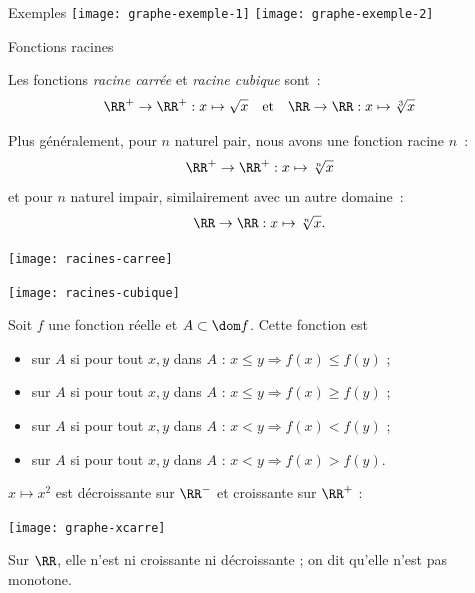 \begin{frame}{Exemples}
\texttt{[image: graphe-exemple-1]} \hfill \texttt{[image: graphe-exemple-2]}
\end{frame}

\begin{frame}{Fonctions racines}
  \begin{example}
    Les fonctions \emph{racine carrée} et \emph{racine cubique} sont~:
    \begin{equation*}
      \RR^+ \to \RR^{+} : x \mapsto \sqrt{x} \quad \text{et} \quad  \RR \to \RR : x \mapsto \sqrt[3]{x}
    \end{equation*}
  \end{example}\pause

  \begin{example}
    Plus généralement, pour \(n\) naturel pair, nous avons une fonction racine \(n\)\ieme{}~:
    \begin{equation*}
      \RR^+ \to \RR^{+} : x \mapsto \sqrt[n]{x}
    \end{equation*}
    et pour \(n\) naturel impair, similairement avec un autre domaine~:
    \begin{equation*}
      \RR \to \RR : x \mapsto \sqrt[n]{x}.
    \end{equation*}
  \end{example}
\end{frame}

\begin{frame}
  \texttt{[image: racines-carree]}
\end{frame}
\begin{frame}
  \texttt{[image: racines-cubique]}
\end{frame}

\begin{frame}
\begin{definition}
  Soit \(f\) une fonction réelle et \(A \subset \dom f\). Cette fonction est
  \begin{itemize}[<+->]
  \item {} sur \(A\) si pour tout \(x, y\) dans \(A\) : \(x \leq y \Rightarrow f(x) \leq f(y)\) ;
  \item {} sur \(A\) si pour tout \(x, y\) dans \(A\) : \(x \leq y \Rightarrow f(x) \geq f(y)\) ;
  \item {} sur \(A\) si pour tout \(x, y\) dans \(A\) : \(x < y \Rightarrow f(x) < f(y)\) ;
  \item {} sur \(A\) si pour tout \(x, y\) dans \(A\) : \(x < y \Rightarrow f(x) > f(y)\).
  \end{itemize}
\end{definition}
\end{frame}
\begin{frame}
  \(x \mapsto x^{2}\) est décroissante sur \(\RR^{-}\) et croissante sur \(\RR^+\) :
  \begin{center}
    \texttt{[image: graphe-xcarre]}
  \end{center}
  \pause Sur \(\RR\), elle n'est ni croissante ni décroissante ; on dit qu'elle n'est pas monotone.
\end{frame}

